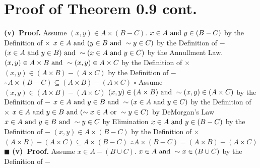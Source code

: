 \documentclass[12pt]{article}
\begin{document}
	\section[20pt]{Proof of Theorem 0.9 cont.}
	\textbf{(v)\ Proof.}
	Assume \((x,y) \in A \times (B - C)\).
	\newline
	\(x \in A \textup{ and } y \in (B - C)\) by the Definition of \(\times\)
	\newline
	\(x \in A \textup{ and } (y \in B \textup{ and } \sim y \in C)\) by the Definition of \(-\)
	\newline
	\((x \in A \textup{ and } y \in B) \textup{ and } \sim(x \in A \textup{ and } y \in C)\) by the Annullment Law.
	\newline
	\((x,y) \in A \times B \textup{ and } \sim (x,y) \in A \times C\) by the Definition of \(\times\)
	\newline
	\((x,y) \in (A \times B) - (A \times C)\) by the Definition of \(-\)
	\newline
	\(\therefore A \times (B - C) \subseteq (A \times B) - (A \times C) \)
	\newline \(\square\) \newline
	Assume \((x,y) \in (A \times B) - (A \times C)\)
	\newline
	\((x,y) \in (A \times B) \textup{ and } \sim (x,y) \in (A \times C)\) by the Definition of \(-\)
	\newline
	\(x \in A \textup{ and } y \in B \textup{ and } \sim(x \in A \textup{ and } y \in C)\) by the Definition of \(\times\)
	\newline
	\(x \in A \textup{ and } y \in B \textup{ and } (\sim x \in A \textup{ or } \sim y \in C)\) by DeMorgan's Law
	\newline
	\(x \in A \textup{ and } y \in B \textup{ and } \sim y \in C\) by Elimination
	\newline
	\(x \in A \textup{ and } y \in (B - C)\) by the Definition of \(-\)
	\newline
	\((x,y) \in A \times (B - C)\) by the Definition of \(\times\)
	\newline
	\((A \times B) - (A \times C) \subseteq A \times (B - C) \)
	\newline
	\(\therefore A \times (B - C) = (A \times B) - (A \times C)\)
	\newline \(\blacksquare\) \newline
	\textbf{(v)\ Proof.}
	Assume \(x \in A - (B \cup C)\).
	\newline
	\(x \in A \textup{ and } \sim x \in (B \cup C)\) by the Definition of \(-\)
\end{document}
